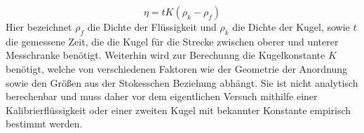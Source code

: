 \begin{equation}
    \label{eq:eta}
\eta = tK(\rho_k - \rho_f)
\end{equation}
Hier bezeichnet $\rho_f$ die Dichte der Flüssigkeit und $\rho_k$ die Dichte der Kugel, sowie $t$ die gemessene Zeit, die die Kugel für die Strecke zwischen oberer und unterer Messchranke benötigt. Weiterhin wird zur Berechunng die Kugelkonstante $K$ benötigt, welche von verschiedenen Faktoren wie der Geometrie der Anordnung sowie den Größen aus der Stokesschen Beziehung abhängt. Sie ist nicht analytisch berechenbar und muss daher vor dem eigentlichen Versuch mithilfe einer Kalibrierflüssigkeit oder einer zweiten Kugel mit bekannter Konstante empirisch bestimmt werden.
